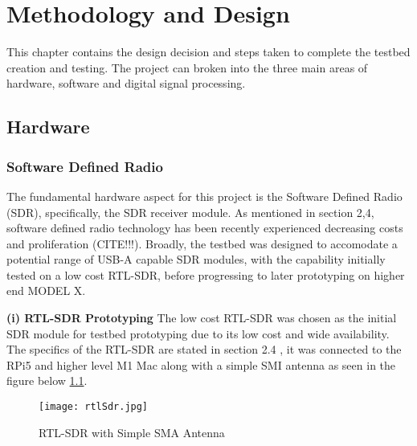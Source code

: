 \chapter{Methodology and Design \label{sec:methodology}}

This chapter contains the design decision and steps taken to complete the testbed creation and testing. The project can broken into the three main areas of hardware, software and digital signal processing. 

\section{Hardware \label{sec:hardware}}

\subsection{Software Defined Radio \label{sec: SDRdongle}}
The fundamental hardware aspect for this project is the Software Defined Radio (SDR), specifically, the SDR receiver module.  As mentioned in section 2,4, software defined radio technology has been recently experienced decreasing costs and proliferation (CITE!!!). Broadly, the testbed was designed to accomodate a potential range of USB-A capable SDR modules, with the capability initially tested on a low cost RTL-SDR, before progressing to later prototyping on higher end MODEL X.

\vspace{0.5cm} \noindent 
\textbf{(i) RTL-SDR Prototyping}
The low cost RTL-SDR was chosen as the initial SDR module for testbed prototyping  due to its low cost and wide availability. The specifics of the RTL-SDR are stated in section 2.4 , it was connected to the RPi5 and higher level M1 Mac along with a simple SMI antenna as seen in the figure below \ref*{fig:rtlSDR}. 

\begin{figure}[htbp]
    \centering
    \texttt{[image: rtlSdr.jpg]}
    \caption{RTL-SDR with Simple SMA Antenna}
    \label{fig:rtlSDR}
\end{figure}

